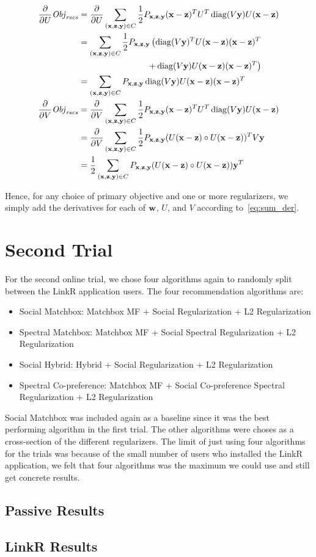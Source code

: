 \begin{itemize}
\begin{align*}
\frac{\partial}{\partial U} \mathit{Obj}_{\mathit{rscs}} & = \frac{\partial}{\partial U} \sum_{(\mathbf{x},\mathbf{z},\mathbf{y}) \in C} \frac{1}{2} P_{\mathbf{x},\mathbf{z},\mathbf{y}} (\mathbf{x} - \mathbf{z})^T U^T \operatorname{diag}(V\mathbf{y}) U (\mathbf{x} - \mathbf{z})\\
& = \sum_{(\mathbf{x},\mathbf{z},\mathbf{y}) \in C} \frac{1}{2} P_{\mathbf{x},\mathbf{z},\mathbf{y}} \left( \operatorname{diag}(V\mathbf{y})^T U (\mathbf{x} - \mathbf{z}) (\mathbf{x} - \mathbf{z})^T \right.\\
& \left. \qquad \qquad \qquad \qquad + \operatorname{diag}(V\mathbf{y}) U (\mathbf{x} - \mathbf{z}) (\mathbf{x} - \mathbf{z})^T \right)\\
& = \sum_{(\mathbf{x},\mathbf{z},\mathbf{y}) \in C} P_{\mathbf{x},\mathbf{z},\mathbf{y}} \operatorname{diag}(V\mathbf{y}) U (\mathbf{x} - \mathbf{z}) (\mathbf{x} - \mathbf{z})^T\\
\frac{\partial}{\partial V} \mathit{Obj}_{\mathit{rscs}} & = \frac{\partial}{\partial V} \sum_{(\mathbf{x},\mathbf{z},\mathbf{y}) \in C} \frac{1}{2} P_{\mathbf{x},\mathbf{z},\mathbf{y}} (\mathbf{x} - \mathbf{z})^T U^T \operatorname{diag}(V\mathbf{y}) U (\mathbf{x} - \mathbf{z})\\
& = \frac{\partial}{\partial V} \sum_{(\mathbf{x},\mathbf{z},\mathbf{y}) \in C} \frac{1}{2} P_{\mathbf{x},\mathbf{z},\mathbf{y}} (U(\mathbf{x}-\mathbf{z}) \circ U(\mathbf{x}-\mathbf{z}))^T V\mathbf{y}\\
& = \frac{1}{2} \sum_{(\mathbf{x},\mathbf{z},\mathbf{y}) \in C} P_{\mathbf{x},\mathbf{z},\mathbf{y}} (U(\mathbf{x}-\mathbf{z}) \circ U(\mathbf{x}-\mathbf{z})) \mathbf{y}^T
\end{align*}
\end{itemize}

Hence, for any choice of primary objective and one or more regularizers,
we simply add the derivatives for each of $\mathbf{w}$, $U$, and $V$
according to~\eqref{eq:sum_der}.

\section{Second Trial}

For the second online trial, we chose four algorithms again to randomly split between the LinkR application users. The four recommendation algorithms are:

\begin{itemize}
\item{Social Matchbox: Matchbox MF + Social Regularization +  L2 Regularization}
\item{Spectral Matchbox: Matchbox MF + Social Spectral Regularization + L2 Regularization}
\item{Social Hybrid: Hybrid + Social Regularization + L2 Regularization}
\item{Spectral Co-preference: Matchbox MF + Social Co-preference Spectral Regularization + L2 Regularization}
\end{itemize}

Social Matchbox was included again as a baseline since it was the best performing algorithm in the first trial. The other algorithms were choses as a cross-section of the different regularizers. The limit of just using four algorithms for the trials was because of the small number of users who installed the LinkR application, we felt that four algorithms was the maximum we could use and still get concrete results.

\subsection{Passive Results}

\subsection{LinkR Results}

